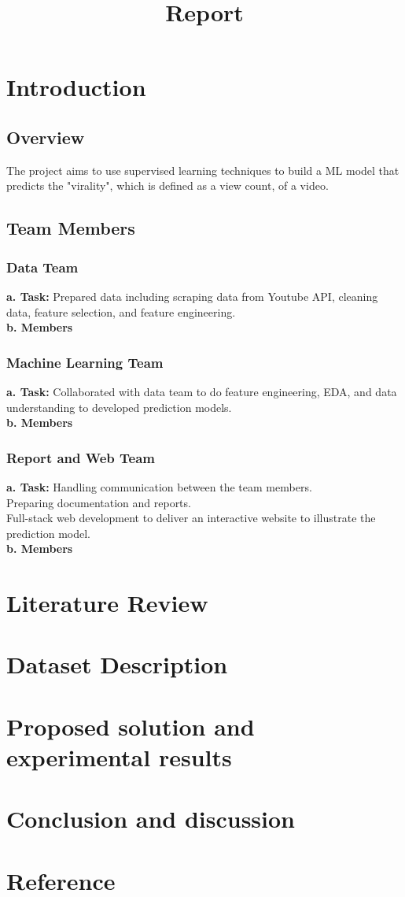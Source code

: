 \documentclass{article}
\title{Report}
\begin{document}
\maketitle

\section{Introduction}
\subsection{Overview}
The project aims to use supervised learning techniques to build a ML model that predicts the "virality", which is defined as a view count, of a video. 
\subsection{Team Members}
\subsubsection{Data Team}
\textbf{a. Task: }
Prepared data including scraping data from Youtube API, cleaning data, feature selection, and feature engineering.\\
\textbf{b. Members}
\subsubsection{Machine Learning Team}
\textbf{a. Task: }
Collaborated with data team to do feature engineering, EDA, and data understanding to developed prediction models.\\
\textbf{b. Members}
\subsubsection{Report and Web Team}
\textbf{a. Task: }
Handling communication between the team members.\\
Preparing documentation and reports.\\
Full-stack web development to deliver an interactive website to illustrate the prediction model.\\
\textbf{b. Members}





\section{Literature Review}
\section{Dataset Description}
\section{Proposed solution and experimental results}
\section{Conclusion and discussion}
\section{Reference}
\end{document}
